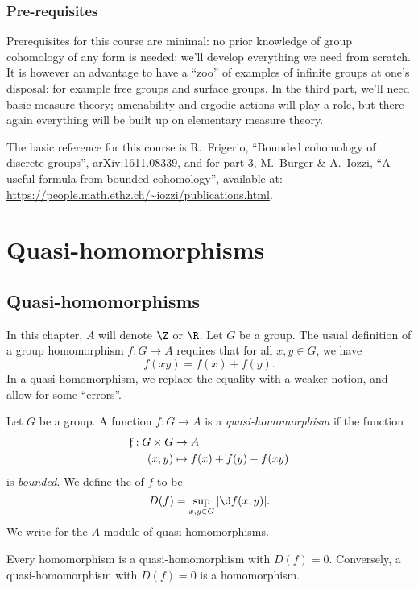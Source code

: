 \documentclass[a4paper]{article}
\newcommand\QH{\mathcal{QH}}
\begin{document}
{\subsubsection*{Pre-requisites}
Prerequisites for this course are minimal: no prior knowledge of group cohomology of any form is needed; we'll develop everything we need from scratch. It is however an advantage to have a ``zoo'' of examples of infinite groups at one's disposal: for example free groups and surface groups. In the third part, we'll need basic measure theory; amenability and ergodic actions will play a role, but there again everything will be built up on elementary measure theory.

The basic reference for this course is R.\ Frigerio, ``Bounded cohomology of discrete groups'', \href{https://arxiv.org/abs/1611.08339}{arXiv:1611.08339}, and for part 3, M.\ Burger \& A.\ Iozzi, ``A useful formula from bounded cohomology'', available at: \url{https://people.math.ethz.ch/~iozzi/publications.html}.%
}
\tableofcontents

\section{Quasi-homomorphisms}
\subsection{Quasi-homomorphisms}
In this chapter, $A$ will denote $\Z$ or $\R$. Let $G$ be a group. The usual definition of a group homomorphism $f: G \to A$ requires that for all $x, y \in G$, we have
\[
  f(xy) = f(x) + f(y).
\]
In a quasi-homomorphism, we replace the equality with a weaker notion, and allow for some ``errors''.

\begin{defi}
  Let $G$ be a group. A function $f: G \to A$ is a \emph{quasi-homomorphism} if the function
  \begin{align*}
    \d f: G \times G &\to A\\
    (x, y) &\mapsto f(x) + f(y) - f(xy)
  \end{align*}
  is \emph{bounded}. We define the  of $f$ to be
  \[
    D(f) = \sup_{x, y \in G} |\d f(x, y)|.
  \]
  We write \term{$\QH(G, A)$} for the $A$-module of quasi-homomorphisms.
\end{defi}

\begin{eg}
  Every homomorphism is a quasi-homomorphism with $D(f) = 0$. Conversely, a quasi-homomorphism with $D(f) = 0$ is a homomorphism.
\end{eg}
\end{document}
